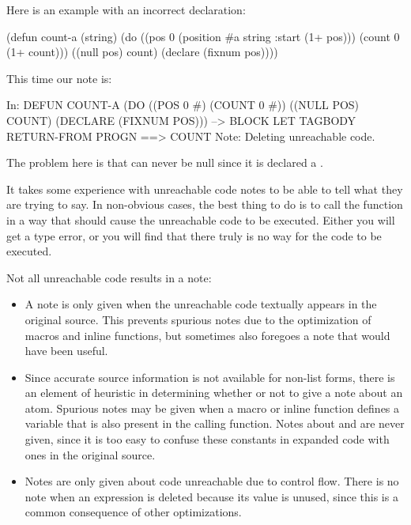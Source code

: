 Here is an example with an incorrect declaration:
\begin{lisp}
(defun count-a (string)
  (do ((pos 0 (position #\back a string :start (1+ pos)))
       (count 0 (1+ count)))
      ((null pos) count)
    (declare (fixnum pos))))
\end{lisp}
This time our note is:
\begin{example}
In: DEFUN COUNT-A
  (DO ((POS 0 #) (COUNT 0 #))
      ((NULL POS) COUNT)
    (DECLARE (FIXNUM POS)))
--> BLOCK LET TAGBODY RETURN-FROM PROGN 
==>
  COUNT
Note: Deleting unreachable code.
\end{example}
The problem here is that  can never be null since it is declared a
.

It takes some experience with unreachable code notes to be able to tell what
they are trying to say.  In non-obvious cases, the best thing to do is to call
the function in a way that should cause the unreachable code to be executed.
Either you will get a type error, or you will find that there truly is no way
for the code to be executed.

Not all unreachable code results in a note:
\begin{itemize}

\item
A note is only given when the unreachable code textually appears in the
original source.  This prevents spurious notes due to the optimization of
macros and inline functions, but sometimes also foregoes a note that would have
been useful.

\item
Since accurate source information is not available for non-list forms, there is
an element of heuristic in determining whether or not to give a note about an
atom.  Spurious notes may be given when a macro or inline function defines a
variable that is also present in the calling function.  Notes about \false{} and
\true{} are never given, since it is too easy to confuse these constants in
expanded code with ones in the original source.

\item
Notes are only given about code unreachable due to control flow.  There is no
note when an expression is deleted because its value is unused, since this is a
common consequence of other optimizations.
\end{itemize}


